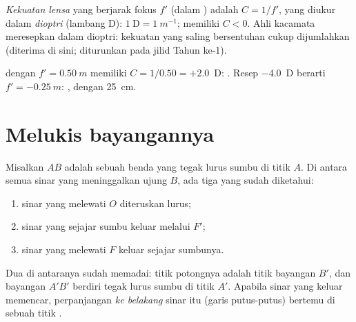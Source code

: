 \begin{definition}\label{def:g11:lenses-and-eye:vergence}
\emph{Kekuatan lensa} yang berjarak fokus $f'$
(dalam ) adalah $C = 1/f'$, yang diukur dalam
\emph{dioptri} (lambang D):
$1~\text{D} = \qty{1}{m^{-1}}$;  memiliki $C < 0$. Ahli
kacamata meresepkan dalam dioptri: kekuatan  yang saling
bersentuhan cukup dijumlahkan (diterima di sini; diturunkan pada jilid
Tahun ke-1).
\end{definition}

\begin{example}\label{ex:g11:lenses-and-eye:vergence}
 dengan $f' = \qty{0.50}{m}$ memiliki $C = 1/0.50 = +2.0$~D:
. Resep $-4.0$~D berarti $f' = \qty{-0.25}{m}$: , dengan
 \qty{25}{cm}.
\end{example}

\section{Melukis bayangannya}

\begin{method}\label{met:g11:lenses-and-eye:rays}
Misalkan $AB$ adalah sebuah benda yang tegak lurus sumbu di titik $A$.
Di antara semua sinar yang meninggalkan ujung $B$, ada tiga yang
 sudah diketahui:
\begin{enumerate}
  \item sinar yang melewati  $O$ diteruskan lurus;
  \item sinar yang sejajar sumbu keluar melalui $F'$;
  \item sinar yang melewati $F$ keluar sejajar sumbunya.
\end{enumerate}
Dua di antaranya sudah memadai: titik potongnya adalah titik bayangan
$B'$, dan bayangan $A'B'$ berdiri tegak lurus sumbu di titik $A'$.
Apabila sinar yang keluar memencar, perpanjangan \emph{ke belakang}
sinar itu (garis putus-putus) bertemu di sebuah titik .
\end{method}

